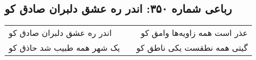 \begin{center}
\section*{رباعی شماره ۳۵۰: اندر ره عشق دلبران صادق کو}
\label{sec:sh350}
\begin{longtable}{l p{0.5cm} r}
اندر ره عشق دلبران صادق کو
&&
عذر است همه زاویه‌ها وامق کو
\\
یک شهر همه طبیب شد حاذق کو
&&
گیتی همه نطقست یکی ناطق کو
\\
\end{longtable}
\end{center}
